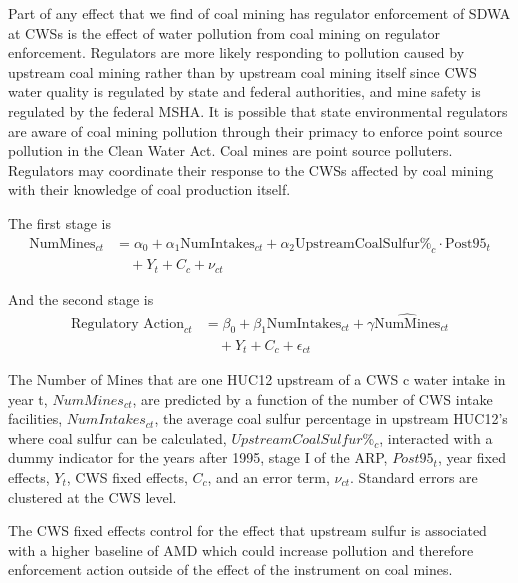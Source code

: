 \documentclass{article}
\begin{document}
Part of any effect that we find of coal mining has regulator enforcement of SDWA at CWSs is the effect of water pollution from coal mining on regulator enforcement. Regulators are more likely responding to pollution caused by upstream coal mining rather than by upstream coal mining itself since CWS water quality is regulated by state and federal authorities, and mine safety is regulated by the federal MSHA. It is possible that state environmental regulators are aware of coal mining pollution through their primacy to enforce point source pollution in the Clean Water Act. Coal mines are point source polluters. Regulators may coordinate their response to the CWSs affected by coal mining with their knowledge of coal production itself.

The first stage is
\begin{equation}\label{1ststage2slsreg}
\begin{split}
\text{NumMines}_{ct} &= \alpha_0 + \alpha_1\text{NumIntakes}_{ct} + \alpha_2\text{UpstreamCoalSulfur\%}_c \cdot \text{Post95}_t \\
&\quad + Y_t + C_c + \nu_{ct}
\end{split}
\end{equation}

And the second stage is
\begin{equation}\label{2ndstage2slsreg}
\begin{split}
\text{Regulatory Action}_{ct} &= \beta_0 + \beta_1\text{NumIntakes}_{ct} + \gamma\widehat{\text{NumMines}}_{ct} \\
&\quad + Y_t + C_c + \epsilon_{ct}
\end{split}
\end{equation}

The Number of Mines that are one HUC12 upstream of a CWS c water intake in year t, $NumMines_{ct}$, are predicted by a function of the number of CWS intake facilities, $NumIntakes_{ct}$, the average coal sulfur percentage in upstream HUC12's where coal sulfur can be calculated, $UpstreamCoalSulfur\%_c$, interacted with a dummy indicator for the years after 1995, stage I of the ARP, $Post95_t$, year fixed effects, $Y_t$, CWS fixed effects, $C_c$, and an error term, $\nu_{ct}$. Standard errors are clustered at the CWS level.

The CWS fixed effects control for the effect that upstream sulfur is associated with a higher baseline of AMD which could increase pollution and therefore enforcement action outside of the effect of the instrument on coal mines.
\end{document}
